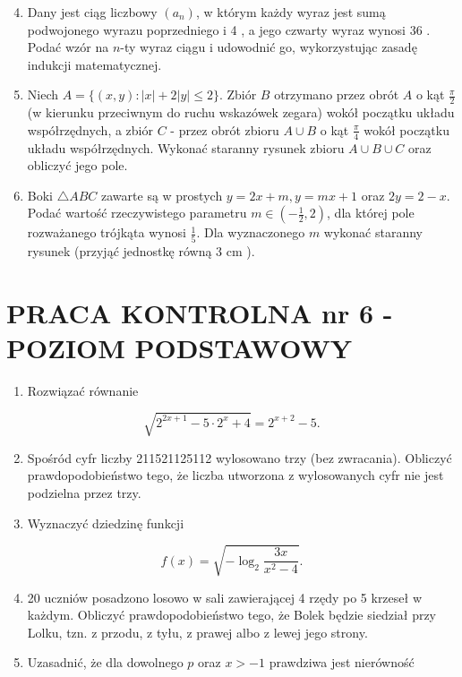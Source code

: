 \documentclass[10pt]{article}
\begin{document}
\begin{enumerate}
  \setcounter{enumi}{3}
  \item Dany jest ciąg liczbowy $\left(a_{n}\right)$, w którym każdy wyraz jest sumą podwojonego wyrazu poprzedniego i 4 , a jego czwarty wyraz wynosi 36 . Podać wzór na $n$-ty wyraz ciągu i udowodnić go, wykorzystując zasadę indukcji matematycznej.
  \item Niech $A=\{(x, y):|x|+2|y| \leqslant 2\}$. Zbiór $B$ otrzymano przez obrót $A$ o kąt $\frac{\pi}{2}$ (w kierunku przeciwnym do ruchu wskazówek zegara) wokół początku układu współrzędnych, a zbiór $C$ - przez obrót zbioru $A \cup B$ o kąt $\frac{\pi}{4}$ wokół początku układu współrzędnych. Wykonać staranny rysunek zbioru $A \cup B \cup C$ oraz obliczyć jego pole.
  \item Boki $\triangle A B C$ zawarte są w prostych $y=2 x+m, y=m x+1$ oraz $2 y=2-x$. Podać wartość rzeczywistego parametru $m \in\left(-\frac{1}{2}, 2\right)$, dla której pole rozważanego trójkąta wynosi $\frac{1}{5}$. Dla wyznaczonego $m$ wykonać staranny rysunek (przyjąć jednostkę równą 3 cm ).
\end{enumerate}

\section*{PRACA KONTROLNA nr 6 - POZIOM PODSTAWOWY}
\begin{enumerate}
  \item Rozwiązać równanie
\end{enumerate}

$$
\sqrt{2^{2 x+1}-5 \cdot 2^{x}+4}=2^{x+2}-5 .
$$

\begin{enumerate}
  \setcounter{enumi}{1}
  \item Spośród cyfr liczby 211521125112 wylosowano trzy (bez zwracania). Obliczyć prawdopodobieństwo tego, że liczba utworzona z wylosowanych cyfr nie jest podzielna przez trzy.
  \item Wyznaczyć dziedzinę funkcji
\end{enumerate}

$$
f(x)=\sqrt{-\log _{2} \frac{3 x}{x^{2}-4}} .
$$

\begin{enumerate}
  \setcounter{enumi}{3}
  \item 20 uczniów posadzono losowo w sali zawierającej 4 rzędy po 5 krzeseł w każdym. Obliczyć prawdopodobieństwo tego, że Bolek będzie siedział przy Lolku, tzn. z przodu, z tyłu, z prawej albo z lewej jego strony.
  \item Uzasadnić, że dla dowolnego $p$ oraz $x>-1$ prawdziwa jest nierówność
\end{enumerate}
\end{document}
